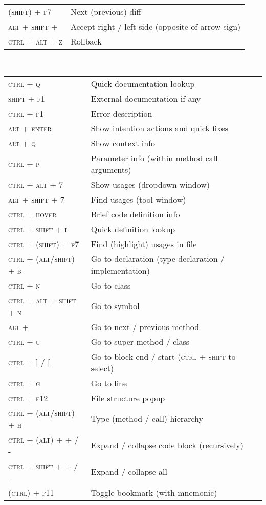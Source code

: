 \documentclass[10pt,a4paper]{article}
\newenvironment{mycolorbox}[2]{%
\begin{tcolorbox}[grow to left by=-1em,grow to right by=-1em,capture=minipage,fonttitle=\large\bfseries, enhanced jigsaw,boxsep=1mm,colback=#1!30!white,on line,tcbox width=auto, toptitle=0mm,colframe=#1,opacityback=0.25,nobeforeafter,title=#2]%
}{\end{tcolorbox}\\[0.2em]}
\newenvironment{textbox}[1]{\begin{mycolorbox}{customcolor}{#1}}{\end{mycolorbox}}
\newcommand{\scut}[1]{\textsc{#1}}
\begin{document}
\begin{multicols}{2}
\begin{textbox}{Diff tool}
{
{\renewcommand{\arraystretch}{1.4}
\begin{tabularx}{\textwidth}{>{\setlength\hsize{.38\hsize}\raggedleft\arraybackslash}X|X}
\scut{(shift) + f7}	&	Next (previous) diff \\
\scut{alt + shift + \textleftarrow\textrightarrow}	& Accept right / left side (opposite of arrow sign) \\
\scut{ctrl + alt + z} & Rollback
\end{tabularx}}}
\end{textbox}

\begin{textbox}{Code Navigation}
{
{\renewcommand{\arraystretch}{1.4}
\begin{tabularx}{\textwidth}{>{\setlength\hsize{.38\hsize}\raggedleft\arraybackslash}X|X}
\scut{ctrl + q}	&	Quick documentation lookup	\\
\scut{shift + f1}	&	External documentation if any	\\
\scut{ctrl + f1}	&	Error description	\\
\scut{alt + enter}	&	Show intention actions and quick fixes	\\
\scut{alt + q}	&	Show context info	\\
\scut{ctrl + p}	&	Parameter info (within method call arguments)	\\
\scut{ctrl + alt + 7 } &	Show usages (dropdown window)	\\  
\scut{alt + shift + 7}	&	Find usages	(tool window) \\
\scut{ctrl + hover}	&	Brief code definition info 	\\
\scut{ctrl + shift + i}	&	Quick definition lookup	\\
\scut{ctrl + (shift) + f7}	&	Find (highlight) usages in file	\\
\scut{ctrl + (alt/shift) + b}	&	Go to declaration (type declaration / implementation)	\\
\scut{ctrl + n} &	Go to class	\\
\scut{ctrl + alt + shift + n}	&	Go to symbol	\\
\scut{alt + \textdownarrow{}\textuparrow}	&	Go to next / previous method	\\
\scut{ctrl + u}	&	Go to super method / class	\\
\scut{ctrl + ] / [}	&	Go to block end / start (\scut{ctrl + shift} to select)	\\
\scut{ctrl + g}	&	Go to line	\\
\scut{ctrl + f12} &	File structure popup	\\
\scut{ctrl + (alt/shift) + h}	&	Type (method / call) hierarchy	\\
\scut{ctrl + (alt) + + / -}	&	Expand / collapse code block (recursively) 	\\
\scut{ctrl + shift + + / -}	&	Expand / collapse all	\\
\scut{(ctrl) + f11}	&	Toggle bookmark (with mnemonic)	
\end{tabularx}}}
\end{textbox}


\end{multicols}
\end{document}
